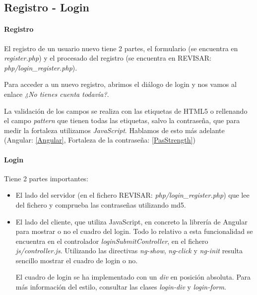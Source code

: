 \documentclass{apuntes}
\begin{document}
\subsection{Registro - Login}

\paragraph{Registro}

El registro de un usuario nuevo tiene 2 partes, el formulario (se encuentra en \textit{register.php}) y el procesado del registro (se encuentra en REVISAR: \textit{php/login\_register.php}).

Para acceder a un nuevo registro, abrimos el diálogo de login y nos vamos al enlace \textit{¿No tienes cuenta todavía?}. 

La validación de los campos se realiza con las etiquetas de HTML5 o rellenando el campo \textit{pattern} que tienen todas las etiquetas, salvo la contraseña, que para medir la fortaleza utilizamos \textit{JavaScript}. Hablamos de esto más adelante (Angular: \ref{Angular}, Fortaleza de la contraseña: \ref{PasStrength})

\paragraph{Login}

Tiene 2 partes importantes:

\begin{itemize}

\item El lado del servidor (en el fichero REVISAR: \textit{php/login\_register.php}) que lee del fichero y comprueba las contraseñas utilizando md5.

\item El lado del cliente, que utiliza JavaScript, en concreto la librería de Angular para mostrar o no el cuadro del login. Todo lo relativo a esta funcionalidad se encuentra en el controlador \textit{loginSubmitController}, en el fichero \textit{js/controller.js}. Utilizando las directivas \textit{ng-show}, \textit{ng-click} y \textit{ng-init} resulta sencillo mostrar el cuadro de login o no. 

El cuadro de login se ha implementado con un \textit{div} en posición absoluta. Para más información del estilo, consultar las clases \textit{login-div} y \textit{login-form}.

\end{itemize}
\end{document}
